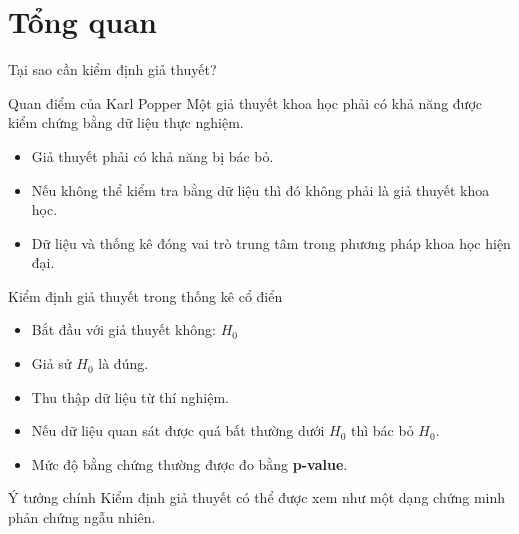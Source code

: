 \section{Tổng quan}
\begin{frame}{Tại sao cần kiểm định giả thuyết?}

\begin{block}{Quan điểm của Karl Popper}
Một giả thuyết khoa học phải có khả năng được kiểm chứng bằng dữ liệu thực nghiệm.
\end{block}

\begin{itemize}
\item Giả thuyết phải có khả năng bị bác bỏ.
\item Nếu không thể kiểm tra bằng dữ liệu thì đó không phải là giả thuyết khoa học.
\item Dữ liệu và thống kê đóng vai trò trung tâm trong phương pháp khoa học hiện đại.
\end{itemize}

\end{frame}

\begin{frame}{Kiểm định giả thuyết trong thống kê cổ điển}

\begin{itemize}

\item Bắt đầu với giả thuyết không: $H_0$
\item Giả sử $H_0$ là đúng.

\item Thu thập dữ liệu từ thí nghiệm.

\item Nếu dữ liệu quan sát được quá bất thường dưới $H_0$ thì bác bỏ $H_0$.

\item Mức độ bằng chứng thường được đo bằng \textbf{p-value}.

\end{itemize}

\begin{block}{Ý tưởng chính}
Kiểm định giả thuyết có thể được xem như một dạng chứng minh phản chứng ngẫu nhiên.
\end{block}

\end{frame}

